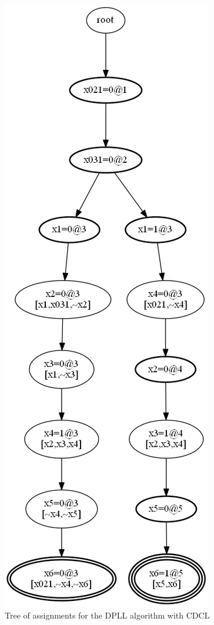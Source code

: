 \documentclass[11pt]{report}
\begin{document}
\begin{figure}
\begin{center}
\includegraphics[keepaspectratio=true,height=.9\textheight]{tree2-bw}
\end{center}
\caption{Tree of assignments for the DPLL algorithm with CDCL}\label{tree2}
\end{figure}
\end{document}
